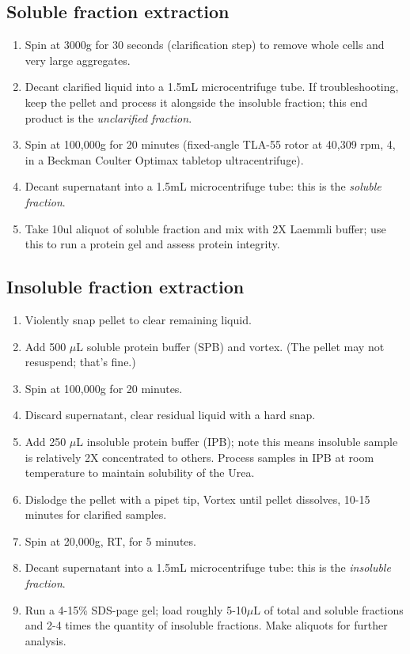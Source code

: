\documentclass{article}
\newcommand{\mul}{\ensuremath{\mu}L\xspace}
\newcommand{\degC}{\celsius\xspace}
\begin{document}
\subsection*{Soluble fraction extraction}
\begin{enumerate}[resume]
  \item Spin at 3000g for 30 seconds (clarification step) to remove whole cells and very large aggregates.
  \item Decant clarified liquid into a 1.5mL microcentrifuge tube. If troubleshooting, keep the pellet and process it alongside the insoluble fraction; this end product is the \emph{unclarified fraction}.
  \item Spin at 100,000g for 20 minutes (fixed-angle TLA-55 rotor at 40,309 rpm, 4\degC, in a Beckman Coulter Optimax tabletop ultracentrifuge).
  \item Decant supernatant into a 1.5mL microcentrifuge tube: this is the \emph{soluble fraction}. 
  \item Take 10ul aliquot of soluble fraction and mix with 2X Laemmli buffer; use this to run a protein gel and assess protein integrity.
\end{enumerate}

\subsection*{Insoluble fraction extraction}
\begin{enumerate}[resume]
  \item Violently snap pellet to clear remaining liquid.
  \item Add 500 \mul soluble protein buffer (SPB) and vortex. (The pellet may not resuspend; that's fine.)
  \item Spin at 100,000g for 20 minutes.
  \item Discard supernatant, clear residual liquid with a hard snap.
  \item Add 250 \mul insoluble protein buffer (IPB); note this means insoluble sample is relatively 2X concentrated to others. Process samples in IPB at room temperature to maintain solubility of the Urea.
  \item Dislodge the pellet with a pipet tip, Vortex until pellet dissolves, 10-15 minutes for clarified samples.
  \item Spin at 20,000g, RT, for 5 minutes.
  \item Decant supernatant into a 1.5mL microcentrifuge tube: this is the \emph{insoluble fraction}.
  \item Run a 4-15\% SDS-page gel; load roughly 5-10\mul of total and soluble fractions and 2-4 times the quantity of insoluble fractions. Make aliquots for further analysis.
\end{enumerate}
\end{document}
